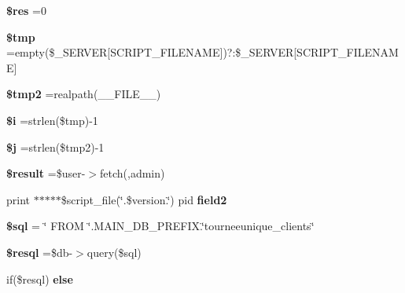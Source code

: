 \begin{DoxyCompactItemize}
{\bfseries \$res} =0
\item 
\mbox{\label{tourneeunique__clients_8php_a57024d47cf8348153f5fdda16f8fefa9}} 
{\bfseries \$tmp} =empty(\$\+\_\+\+S\+E\+R\+V\+ER\mbox{[}\textquotesingle{}S\+C\+R\+I\+P\+T\+\_\+\+F\+I\+L\+E\+N\+A\+ME\textquotesingle{}\mbox{]})?\textquotesingle{}\textquotesingle{}\+:\$\+\_\+\+S\+E\+R\+V\+ER\mbox{[}\textquotesingle{}S\+C\+R\+I\+P\+T\+\_\+\+F\+I\+L\+E\+N\+A\+ME\textquotesingle{}\mbox{]}
\item 
\mbox{\label{tourneeunique__clients_8php_aed9bcb6730d1510376ce80e32bd9504d}} 
{\bfseries \$tmp2} =realpath(\+\_\+\+\_\+\+F\+I\+L\+E\+\_\+\+\_\+)
\item 
\mbox{\label{tourneeunique__clients_8php_a83018d9153d17d91fbcf3bc10158d34f}} 
{\bfseries \$i} =strlen(\$tmp)-\/1
\item 
\mbox{\label{tourneeunique__clients_8php_a6f16db779ef3ccea921b277b5dc245d1}} 
{\bfseries \$j} =strlen(\$tmp2)-\/1
\item 
\mbox{\label{tourneeunique__clients_8php_a112ef069ddc0454086e3d1e6d8d55d07}} 
{\bfseries \$result} =\$user-\/$>$fetch(\textquotesingle{}\textquotesingle{},\textquotesingle{}admin\textquotesingle{})
\item 
\mbox{\label{tourneeunique__clients_8php_af9edfce80596a171cfb2884ba7ad01df}} 
print $\ast$$\ast$$\ast$$\ast$$\ast$\$script\+\_\+file(\char`\"{}.\$version.\char`\"{}) pid {\bfseries field2}
\item 
\mbox{\label{tourneeunique__clients_8php_a047170d6020a882807665812a27e2525}} 
{\bfseries \$sql} = \char`\"{} F\+R\+OM \char`\"{}.M\+A\+I\+N\+\_\+\+D\+B\+\_\+\+P\+R\+E\+F\+I\+X.\char`\"{}tourneeunique\+\_\+clients\char`\"{}
\item 
\mbox{\label{tourneeunique__clients_8php_a6adc5ef389ab51c21dee69262018d615}} 
{\bfseries \$resql} =\$db-\/$>$query(\$sql)
\item 
if(\$resql) {\bfseries else}
\end{DoxyCompactItemize}


